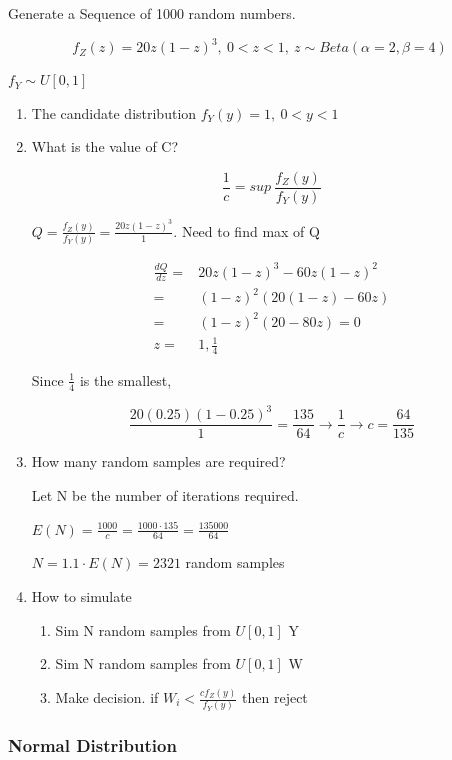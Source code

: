 \documentclass[11pt]{article}
\begin{document}
Generate a Sequence of 1000 random numbers.

$$
f_Z (z) = 20z (1 - z)^3, \ 0 < z < 1, \ z \sim Beta(\alpha = 2, \beta = 4)
$$

\(f_Y \sim U[0,1]\)

\begin{enumerate}
\item The candidate distribution \(f_Y(y) = 1, \ 0 < y < 1\)
\item What is the value of C?

$$
   \frac{1}{c} = sup \ \frac{f_Z(y)}{f_Y(y)}
   $$

\(Q = \frac{f_Z(y)}{f_Y(y)} = \frac{20z(1 - z)^3}{1}\).  Need to find max of Q

\begin{subequations}
\label{first:main}
\begin{align}
\frac{dQ}{dz} = & 20 z(1 - z)^3 - 60z(1 - z)^2\\
= & (1 - z)^2 (20 (1 - z) - 60z)\\
= & (1 - z)^2 (20 - 80z) = 0\\
z = & 1, \frac{1}{4}
\end{align}
\end{subequations}

Since \(\frac{1}{4}\) is the smallest,

$$
    \frac{20 (0.25)(1 - 0.25)^3}{1} = \frac{135}{64} \to \frac{1}{c} \to c = \frac{64}{135}
    $$

\item How many random samples are required?

Let N be the number of iterations required.

\(E(N) = \frac{1000}{c} = \frac{1000 \cdot 135}{64} = \frac{135000}{64}\)

\(N = 1.1 \cdot E(N) = 2321\) random samples

\item How to simulate

\begin{enumerate}
\item Sim N random samples from \(U[0,1]\) Y
\item Sim N random samples from \(U[0,1]\) W
\item Make decision. if \(W_i < \frac{c f_Z(y)}{f_Y(y)}\) then reject
\end{enumerate}
\end{enumerate}
\subsubsection{Normal Distribution}
\label{sec:org063dc82}
\end{document}

